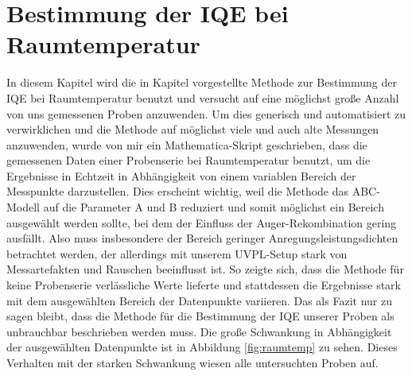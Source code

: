\chapter{Bestimmung der IQE bei Raumtemperatur}

\label{chap:raum}
\thispagestyle{fancy}

In diesem Kapitel wird die in Kapitel vorgestellte Methode zur Bestimmung der IQE bei Raumtemperatur benutzt und versucht auf eine möglichst große Anzahl von uns gemessenen Proben anzuwenden. 
Um dies generisch und automatisiert zu verwirklichen und die Methode auf möglichst viele und auch alte Messungen anzuwenden, wurde von mir ein Mathematica-Skript geschrieben, dass die gemessenen Daten einer Probenserie bei Raumtemperatur benutzt, um die Ergebnisse in Echtzeit in Abhängigkeit von einem variablen Bereich der Messpunkte darzustellen. Dies erscheint wichtig, weil die Methode das ABC-Modell auf die Parameter A und B reduziert und somit möglichst ein Bereich ausgewählt werden sollte, bei dem der Einfluss der Auger-Rekombination gering ausfällt. Also muss insbesondere der Bereich geringer Anregungsleistungsdichten betrachtet werden, der allerdings mit unserem UVPL-Setup stark von Messartefakten und Rauschen beeinflusst ist. So zeigte sich, dass die Methode für keine Probenserie verlässliche Werte lieferte und stattdessen die Ergebnisse stark mit dem ausgewählten Bereich der Datenpunkte variieren.
Das als Fazit nur zu sagen bleibt, dass die Methode für die Bestimmung der IQE unserer Proben als unbrauchbar beschrieben werden muss. Die große Schwankung in Abhängigkeit der ausgewählten Datenpunkte ist in Abbildung \ref{fig:raumtemp} zu sehen. Dieses Verhalten mit der starken Schwankung wiesen alle untersuchten Proben auf. 
%
